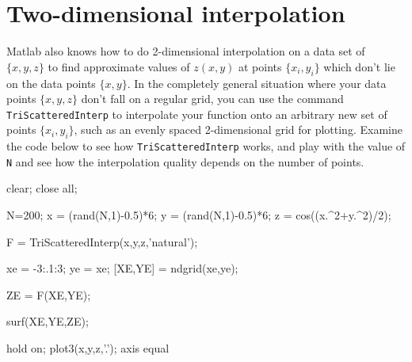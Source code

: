 \section{Two-dimensional interpolation}

  Matlab also knows how to
do 2-dimensional interpolation on a data set of $\{x,y,z\}$ to find
approximate values of $z(x,y)$ at points $\{x_i,y_i\}$ which don't lie on
the data points $\{x,y\}$.  In the completely general situation where your
data points $\{x,y,z\}$ don't fall on a regular grid, you can use the
command {\tt TriScatteredInterp} to interpolate your function onto an arbitrary
new set of points $\{x_i,y_i\}$, such as an evenly
spaced 2-dimensional grid for plotting. Examine the code below to see how
{\tt TriScatteredInterp} works, and play with the value of {\tt N} and see
how the interpolation quality depends on the number of points.
\begin{codeexample}
\begin{VerbatimOut}{\listingFile}
clear; close all;

N=200;
x = (rand(N,1)-0.5)*6;
y = (rand(N,1)-0.5)*6;
z = cos((x.^2+y.^2)/2);

F = TriScatteredInterp(x,y,z,'natural');

xe = -3:.1:3;
ye = xe;
[XE,YE] = ndgrid(xe,ye);

ZE = F(XE,YE);

surf(XE,YE,ZE);

hold on;
plot3(x,y,z,'.');
axis equal
\end{VerbatimOut}
\end{codeexample}

